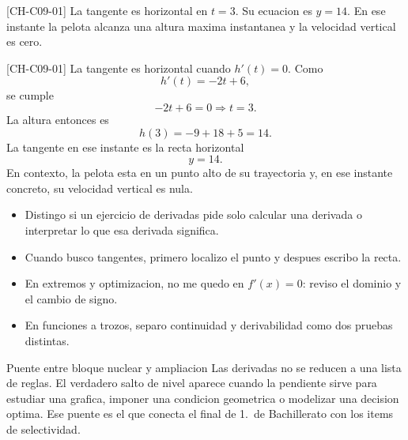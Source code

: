 \begin{shortanswer}{[CH-C09-01]}
La tangente es horizontal en \(t=3\). Su ecuacion es \(y=14\). En ese instante la pelota
alcanza una altura maxima instantanea y la velocidad vertical es cero.
\end{shortanswer}

\begin{fullsolution}{[CH-C09-01]}
La tangente es horizontal cuando \(h'(t)=0\). Como
\[
h'(t)=-2t+6,
\]
se cumple
\[
-2t+6=0 \Longrightarrow t=3.
\]
La altura entonces es
\[
h(3)=-9+18+5=14.
\]
La tangente en ese instante es la recta horizontal
\[
y=14.
\]
En contexto, la pelota esta en un punto alto de su trayectoria y, en ese instante concreto,
su velocidad vertical es nula.
\end{fullsolution}

\begin{selfcheck}
\begin{itemize}
  \item Distingo si un ejercicio de derivadas pide solo calcular una derivada o interpretar lo
  que esa derivada significa.
  \item Cuando busco tangentes, primero localizo el punto y despues escribo la recta.
  \item En extremos y optimizacion, no me quedo en \(f'(x)=0\): reviso el dominio y el cambio
  de signo.
  \item En funciones a trozos, separo continuidad y derivabilidad como dos pruebas distintas.
\end{itemize}
\end{selfcheck}

\begin{extension}{Puente entre bloque nuclear y ampliacion}
Las derivadas no se reducen a una lista de reglas. El verdadero salto de nivel aparece cuando
la pendiente sirve para estudiar una grafica, imponer una condicion geometrica o modelizar una
decision optima. Ese puente es el que conecta el final de 1.\ de Bachillerato con los items de
selectividad.
\end{extension}
